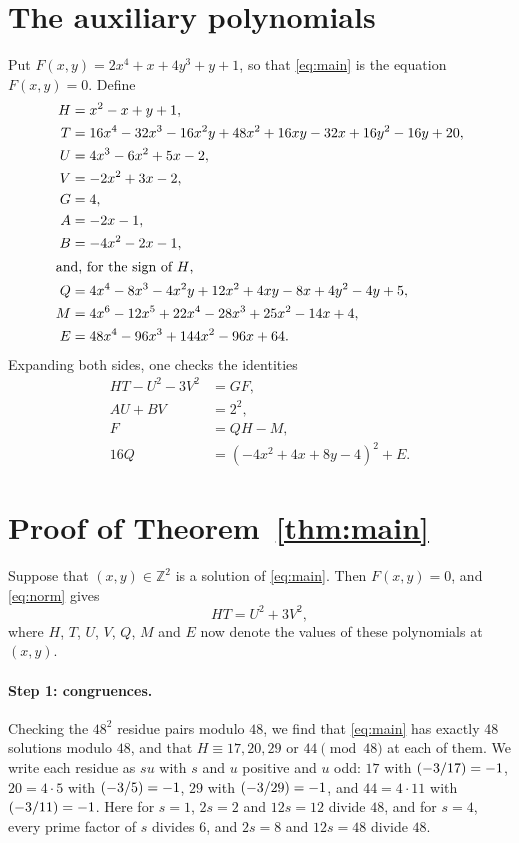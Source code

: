 \documentclass[11pt]{article}
\newcommand{\Z}{\mathbb{Z}}
\newcommand{\leg}[2]{\mathchoice{\biggl(\dfrac{#1}{#2}\biggr)}{(#1/#2)}{(#1/#2)}{(#1/#2)}}
\begin{document}
\section{The auxiliary polynomials}

Put $F(x,y)=2x^{4}+x+4y^{3}+y+1$, so that \eqref{eq:main} is the equation $F(x,y)=0$. Define
\begin{align*}
H&=x^{2}-x+y+1,\\
T&=16x^{4}-32x^{3}-16x^{2}y+48x^{2}+16xy-32x+16y^{2}-16y+20,\\
U&=4x^{3}-6x^{2}+5x-2,\\
V&=-2x^{2}+3x-2,\\
G&=4,\\
A&=-2x-1,\\
B&=-4x^{2}-2x-1,\\
\intertext{and, for the sign of $H$,}
Q&=4x^{4}-8x^{3}-4x^{2}y+12x^{2}+4xy-8x+4y^{2}-4y+5,\\
M&=4x^{6}-12x^{5}+22x^{4}-28x^{3}+25x^{2}-14x+4,\\
E&=48x^{4}-96x^{3}+144x^{2}-96x+64.
\end{align*}
Expanding both sides, one checks the identities
\begin{align}
HT-U^2-3V^2&=GF,\label{eq:norm}\\
AU+BV&=2^{2},\label{eq:bezout}\\
F&=QH-M,\label{eq:sign}\\
16Q&=(-4x^{2}+4x+8y-4)^2+E.\label{eq:sign2}
\end{align}

\section{Proof of Theorem~\ref{thm:main}}

Suppose that $(x,y)\in\Z^2$ is a solution of \eqref{eq:main}. Then $F(x,y)=0$, and \eqref{eq:norm} gives
\begin{equation}\label{eq:HT}
HT=U^2+3V^2,
\end{equation}
where $H$, $T$, $U$, $V$, $Q$, $M$ and $E$ now denote the values of these polynomials at $(x,y)$.

\paragraph{Step 1: congruences.} Checking the $48^2$ residue pairs modulo $48$, we find that \eqref{eq:main} has exactly 48 solutions modulo $48$, and that $H\equiv17,\allowbreak 20,\allowbreak 29\text{ or }44\pmod{48}$ at each of them. We write each residue as $su$ with $s$ and $u$ positive and $u$ odd: $17$ with $\leg{-3}{17}=-1$, $20=4\cdot5$ with $\leg{-3}{5}=-1$, $29$ with $\leg{-3}{29}=-1$, and $44=4\cdot11$ with $\leg{-3}{11}=-1$. Here for $s=1$, $2s=2$ and $12s=12$ divide $48$, and for $s=4$, every prime factor of $s$ divides $6$, and $2s=8$ and $12s=48$ divide $48$.
\end{document}
